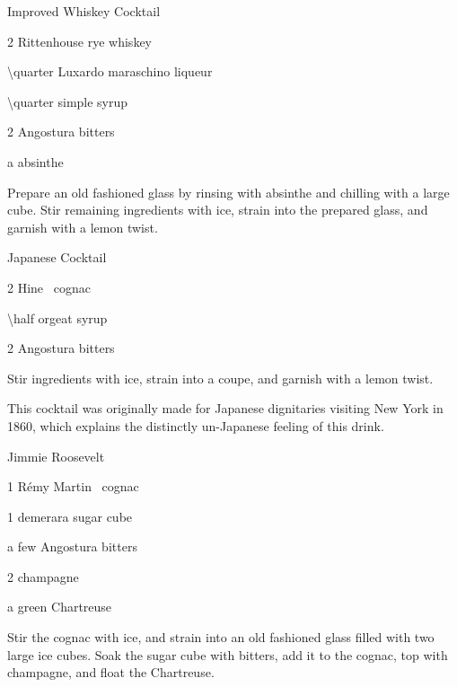 \begin{PDTCocktail*}{Improved Whiskey Cocktail}
	\begin{Ingredients}
	\item \SI{2}{\oz} Rittenhouse rye whiskey
	\item \SI{\quarter}{\oz} Luxardo maraschino liqueur
	\item \SI{\quarter}{\oz} simple syrup
	\item 2 \si{\dashes} Angostura bitters
	\item a \si{\dash} absinthe
	\end{Ingredients}
	
	\begin{Instructions}
	Prepare an old fashioned glass by rinsing with absinthe and chilling with a large cube.  Stir remaining ingredients with ice, strain into the prepared glass, and garnish with a lemon twist.
	\end{Instructions}
\end{PDTCocktail*}

\begin{PDTCocktail*}{Japanese Cocktail}
	\begin{Ingredients}
	\item \SI{2}{\oz} Hine \vsop\ cognac
	\item \SI{\half}{\oz} orgeat syrup
	\item 2 \si{\dashes} Angostura bitters
	\end{Ingredients}
	
	\begin{Instructions}
	Stir ingredients with ice, strain into a coupe, and garnish with a lemon twist.
	
	This cocktail was originally made for Japanese dignitaries visiting New York in 1860, which explains the distinctly un-Japanese feeling of this drink.
	\end{Instructions}
\end{PDTCocktail*}

\begin{PDTCocktail*}{Jimmie Roosevelt}
	\begin{Ingredients}
	\item \SI{1}{\oz} R\'emy Martin \vsop\ cognac
	\item 1 demerara sugar cube
	\item a few \si{\dashes} Angostura bitters
	\item \SI{2}{\oz} champagne
	\item a \si{\dash} green Chartreuse
	\end{Ingredients}
	
	\begin{Instructions}
	Stir the cognac with ice, and strain into an old fashioned glass filled with two large ice cubes.  Soak the sugar cube with bitters, add it to the cognac, top with champagne, and float the Chartreuse.
	\end{Instructions}
\end{PDTCocktail*}

